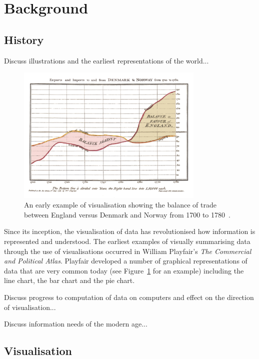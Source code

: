 \section{Background}

\subsection{History}

Discuss illustrations and the earliest representations of the world...

\begin{figure}
    \centering
    \includegraphics[width=0.8\textwidth]{../images/playfair-graph.png}
    \caption{An early example of visualisation showing the balance of trade between England versus Denmark and Norway from 1700 to 1780~\protect\cite{Playfair1786}.}
    \label{fig:playfair-graph}
\end{figure}

Since its inception, the visualisation of data has revolutionised how information is represented and understood. The earliest examples of visually summarising data through the use of visualisations occurred in William Playfair's \textit{The Commercial and Political Atlas}. Playfair developed a number of graphical representations of data that are very common today (see Figure~\ref{fig:playfair-graph} for an example) including the line chart, the bar chart and the pie chart.

Discuss progress to computation of data on computers and effect on the direction of visualisation...

Discuss information needs of the modern age...

\subsection{Visualisation}

